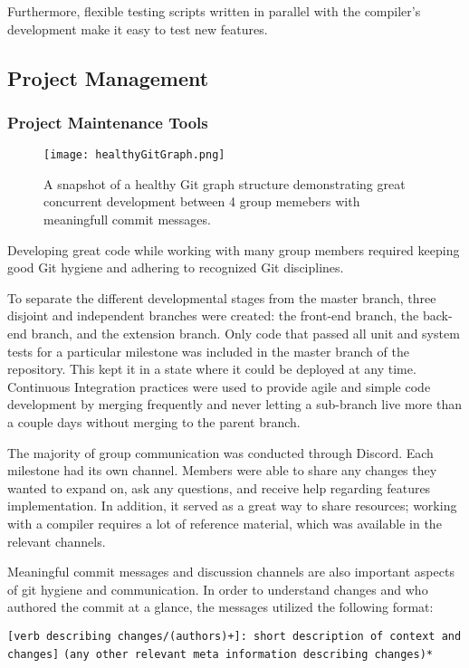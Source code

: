 \documentclass[a4paper,12pt]{article}
\begin{document}
Furthermore, flexible testing scripts written in parallel with the compiler's development make it easy to test new features.

\subsection*{Project Management}

\subsubsection*{Project Maintenance Tools}

\begin{figure}
  \texttt{[image: healthyGitGraph.png]}
  \caption{A snapshot of a healthy Git graph structure demonstrating great concurrent development between 4 group memebers with meaningfull commit messages.}
  \label{fig:gitGraph}
\end{figure}

Developing great code while working with many group members required keeping good Git hygiene and adhering to recognized Git disciplines.

To separate the different developmental stages from the master branch, three disjoint and independent branches were created: the front-end branch, the back-end branch, and the extension branch. Only code that passed all unit and system tests for a particular milestone was included in the master branch of the repository. This kept it in a state where it could be deployed at any time. Continuous Integration practices were used to provide agile and simple code development by merging frequently and never letting a sub-branch live more than a couple days without merging to the parent branch.

The majority of group communication was conducted through Discord. Each milestone had its own channel. Members were able to share any changes they wanted to expand on, ask any questions, and receive help regarding features implementation. In addition, it served as a great way to share resources; working with a compiler requires a lot of reference material, which was available in the relevant channels.

Meaningful commit messages and discussion channels are also important aspects of git hygiene and communication. In order to understand changes and who authored the commit at a glance, the messages utilized the following format:

\verb|[verb describing changes/(authors)+]: short description of context and changes]|
\verb|(any other relevant meta information describing changes)*|
\end{document}
